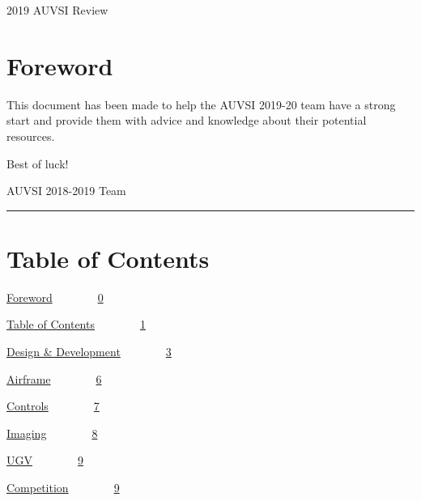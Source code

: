 {2019 AUVSI Review}

\hypertarget{h.mzje0j87021i}{\section{\texorpdfstring{{Foreword}}{Foreword}}\label{h.mzje0j87021i}}

{This document has been made to help the AUVSI 2019-20 team have a
strong start and provide them with advice and knowledge about their
potential resources.}

{}

{Best of luck!}

{AUVSI 2018-2019 Team}

{}

\begin{center}\rule{0.5\linewidth}{\linethickness}\end{center}

\section{\texorpdfstring{{}}{}}\label{h.lb69zzmn1cdr}

\hypertarget{h.ricyvmwymk08}{\section{\texorpdfstring{{Table of
Contents}}{Table of Contents}}\label{h.ricyvmwymk08}}

{\protect\hyperlink{h.mzje0j87021i}{Foreword}}{~~~~~~~~}{\protect\hyperlink{h.mzje0j87021i}{0}}

{\protect\hyperlink{h.ricyvmwymk08}{Table of
Contents}}{~~~~~~~~}{\protect\hyperlink{h.ricyvmwymk08}{1}}

{\protect\hyperlink{h.yankc9crn1j8}{Design \&
Development}}{~~~~~~~~}{\protect\hyperlink{h.yankc9crn1j8}{3}}

{\protect\hyperlink{h.49zf76hgeobq}{Airframe}}{~~~~~~~~}{\protect\hyperlink{h.49zf76hgeobq}{6}}

{\protect\hyperlink{h.juthe769iomo}{Controls}}{~~~~~~~~}{\protect\hyperlink{h.juthe769iomo}{7}}

{\protect\hyperlink{h.nive7frldvsy}{Imaging}}{~~~~~~~~}{\protect\hyperlink{h.nive7frldvsy}{8}}

{\protect\hyperlink{h.jeaggz3ydved}{UGV}}{~~~~~~~~}{\protect\hyperlink{h.jeaggz3ydved}{9}}

{\protect\hyperlink{h.igopbhq1riqa}{Competition}}{~~~~~~~~}{\protect\hyperlink{h.igopbhq1riqa}{9}}

